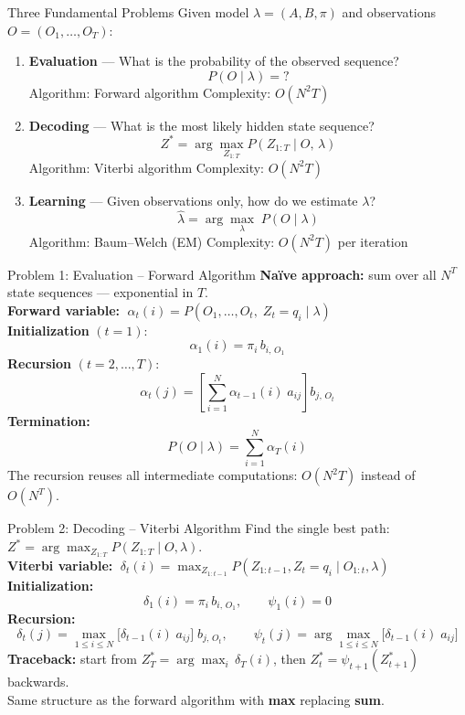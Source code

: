 \documentclass[aspectratio=169,t]{beamer}
\begin{document}
\begin{frame}{Three Fundamental Problems}
  Given model $\lambda = (A, B, \pi)$ and observations $O = (O_1, \ldots, O_T)$:
  \vspace{0.2cm}
  \begin{enumerate}
    \item \textbf{Evaluation} — What is the probability of the observed sequence?
      $$P(O \mid \lambda) = ?$$
      {\small\textcolor{accentred}{Algorithm:} Forward algorithm \hfill Complexity: $O(N^2 T)$}
    \vspace{0.2cm}
    \item \textbf{Decoding} — What is the most likely hidden state sequence?
      $$Z^* = \arg\max_{Z_{1:T}} P(Z_{1:T} \mid O,\,\lambda)$$
      {\small\textcolor{accentred}{Algorithm:} Viterbi algorithm \hfill Complexity: $O(N^2 T)$}
    \vspace{0.2cm}
    \item \textbf{Learning} — Given observations only, how do we estimate $\lambda$?
      $$\hat\lambda = \arg\max_{\lambda}\; P(O \mid \lambda)$$
      {\small\textcolor{accentred}{Algorithm:} Baum--Welch (EM) \hfill Complexity: $O(N^2 T)$ per iteration}
  \end{enumerate}
\end{frame}

\begin{frame}{Problem 1: Evaluation -- Forward Algorithm}
  \textbf{Naïve approach:} sum over all $N^T$ state sequences — exponential in $T$.\\[0.2cm]
  \textbf{Forward variable:}
  $\;\alpha_t(i) = P(O_1, \ldots, O_t,\; Z_t = q_i \mid \lambda)$\\[0.2cm]
  \textbf{Initialization} $(t=1)$:
  $$\alpha_1(i) = \pi_i\, b_{i,\,O_1}$$
  \textbf{Recursion} $(t = 2, \ldots, T)$:
  $$\alpha_t(j) = \left[\sum_{i=1}^N \alpha_{t-1}(i)\; a_{ij}\right] b_{j,\,O_t}$$
  \textbf{Termination:}
  $$P(O \mid \lambda) = \sum_{i=1}^N \alpha_T(i)$$
  \vspace{0.1cm}
  The recursion reuses all intermediate computations: $O(N^2 T)$ instead of $O(N^T)$.
\end{frame}

\begin{frame}{Problem 2: Decoding -- Viterbi Algorithm}
  Find the single best path: $Z^* = \arg\max_{Z_{1:T}} P(Z_{1:T}  \mid O, \lambda)$.\\[0.2cm]
  \textbf{Viterbi variable:}
  $\;\delta_t(i) = \max_{Z_{1:t-1}} P(Z_{1:t-1}, Z_t = q_i \mid O_{1:t}, \lambda)$\\[0.2cm]
  \textbf{Initialization:}
  $$\delta_1(i) = \pi_i\, b_{i,\,O_1}, \qquad \psi_1(i) = 0$$
  \textbf{Recursion:}
  $$\delta_t(j) = \max_{1\le i\le N}\bigl[\delta_{t-1}(i)\;a_{ij}\bigr]\;b_{j,\,O_t},
    \qquad
    \psi_t(j) = \arg\max_{1\le i\le N}\bigl[\delta_{t-1}(i)\;a_{ij}\bigr]$$
  \textbf{Traceback:} start from $Z^*_T = \arg\max_i\,\delta_T(i)$, then
  $Z^*_t = \psi_{t+1}(Z^*_{t+1})$ backwards.\\[0.15cm]
  Same structure as the forward algorithm with \textbf{max} replacing \textbf{sum}.
\end{frame}
\end{document}
